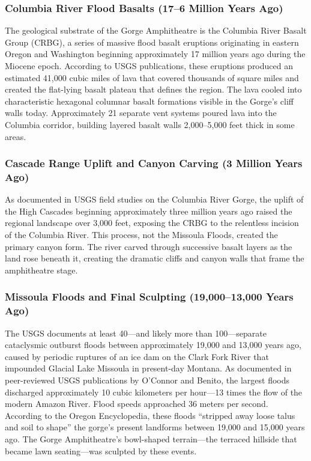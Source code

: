 \documentclass[11pt,letterpaper]{article}
\begin{document}
\subsubsection{Columbia River Flood Basalts (17--6 Million Years Ago)}

The geological substrate of the Gorge Amphitheatre is the Columbia River Basalt Group (CRBG), a series of massive flood basalt eruptions originating in eastern Oregon and Washington beginning approximately 17 million years ago during the Miocene epoch. According to USGS publications, these eruptions produced an estimated 41,000 cubic miles of lava that covered thousands of square miles and created the flat-lying basalt plateau that defines the region. The lava cooled into characteristic hexagonal columnar basalt formations visible in the Gorge's cliff walls today. Approximately 21 separate vent systems poured lava into the Columbia corridor, building layered basalt walls 2,000--5,000 feet thick in some areas.

\subsubsection{Cascade Range Uplift and Canyon Carving (3 Million Years Ago)}

As documented in USGS field studies on the Columbia River Gorge, the uplift of the High Cascades beginning approximately three million years ago raised the regional landscape over 3,000 feet, exposing the CRBG to the relentless incision of the Columbia River. This process, not the Missoula Floods, created the primary canyon form. The river carved through successive basalt layers as the land rose beneath it, creating the dramatic cliffs and canyon walls that frame the amphitheatre stage.

\subsubsection{Missoula Floods and Final Sculpting (19,000--13,000 Years Ago)}

The USGS documents at least 40---and likely more than 100---separate cataclysmic outburst floods between approximately 19,000 and 13,000 years ago, caused by periodic ruptures of an ice dam on the Clark Fork River that impounded Glacial Lake Missoula in present-day Montana. As documented in peer-reviewed USGS publications by O'Connor and Benito, the largest floods discharged approximately 10 cubic kilometers per hour---13 times the flow of the modern Amazon River. Flood speeds approached 36 meters per second. According to the Oregon Encyclopedia, these floods ``stripped away loose talus and soil to shape'' the gorge's present landforms between 19,000 and 15,000 years ago. The Gorge Amphitheatre's bowl-shaped terrain---the terraced hillside that became lawn seating---was sculpted by these events.
\end{document}
